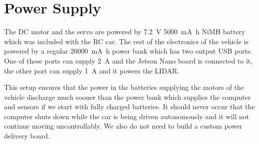 \section{Power Supply}

The \gls*{DC} motor and the servo are powered by \SI{7.2}{\volt} \SI{5000}{\milli\ampere\hour} NiMH battery which was included with the \gls*{RC} car. The rest of the electronics of the vehicle is powered by a regular \SI{20000}{\milli\ampere\hour} power bank which has two output USB ports. One of these ports can supply \SI{2}{\ampere} and the Jetson Nano board is connected to it, the other port can supply \SI{1}{\ampere} and it powers the \gls*{LIDAR}.

This setup ensures that the power in the batteries supplying the motors of the vehicle discharge much sooner than the power bank which supplies the computer and sensors if we start with fully charged batteries. It should never occur that the computer shuts down while the car is being driven autonomously and it will not continue moving uncontrollably. We also do not need to build a custom power delivery board.